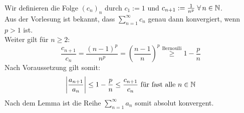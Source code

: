\documentclass[../ana1u.tex]{subfiles}
\begin{document}
\begin{bew}
    Wir definieren die Folge \((c_n)_n\) durch \(c_1 := 1\) und \(c_{n+1} := \frac{1}{n^p} \; \forall \, n \in \mathbb{N}\).\\
    Aus der Vorlesung ist bekannt, dass \(\sum_{n=1}^{\infty} c_n\) genau dann konvergiert, wenn \(p > 1\) ist.\\
    Weiter gilt für \(n \geq 2\):
    \[\frac{c_{n+1}}{c_n} = \frac{(n-1)^p}{n^p} = \left(\frac{n-1}{n}\right)^p \overset{\text{Bernoulli}}{\geq} 1 - \frac{p}{n}\]
    Nach Voraussetzung gilt somit:
    \[\left|\frac{a_{n+1}}{a_n}\right| \leq 1 - \frac{p}{n} \leq \frac{c_{n+1}}{c_n} \text{ für fast alle } n \in \mathbb{N}\]
    Nach dem Lemma ist die Reihe \(\sum_{n=1}^{\infty} a_n\) somit absolut konvergent.
\end{bew}
\end{document}
